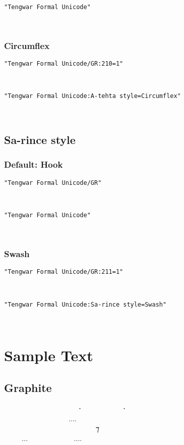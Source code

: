 \documentclass[11pt,a4paper]{article}
\begin{document}
\formalGR 

\noindent \texttt{"Tengwar Formal Unicode"}

\formalAAT 

\subsubsection{Circumflex}

\texttt{"Tengwar Formal Unicode/GR:210=1"}

\formalGRcircumflex 

\noindent \texttt{"Tengwar Formal Unicode:A-tehta style=Circumflex"}

\formalAATcircumflex 


\subsection{Sa-rince style}

\subsubsection{Default: Hook}

\texttt{"Tengwar Formal Unicode/GR"}

\formalGR 

\noindent \texttt{"Tengwar Formal Unicode"}

\formalAAT 

\subsubsection{Swash}

\texttt{"Tengwar Formal Unicode/GR:211=1"}

\formalGRswash 

\noindent \texttt{"Tengwar Formal Unicode:Sa-rince style=Swash"}

\formalAATswash 


\newpage

\section{Sample Text}

\subsection{Graphite}
\formalGR   ‍   ⸱‍  ‍ ⸱ \\
    ‍....  ‍  \\
  ‍   ‍ ‍ ⁊ ‍  \\
...  .... \\
\end{document}
